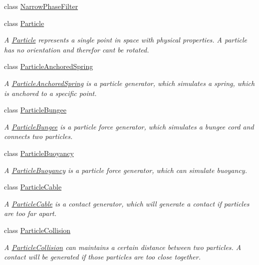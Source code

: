 \begin{DoxyCompactItemize}
class \mbox{\hyperlink{classr3_1_1_narrow_phase_filter}{Narrow\+Phase\+Filter}}
\item 
class \mbox{\hyperlink{classr3_1_1_particle}{Particle}}
\begin{DoxyCompactList}\small\item\em A \mbox{\hyperlink{classr3_1_1_particle}{Particle}} represents a single point in space with physical properties. A particle has no orientation and therefor can\textquotesingle{}t be rotated. \end{DoxyCompactList}\item 
class \mbox{\hyperlink{classr3_1_1_particle_anchored_spring}{Particle\+Anchored\+Spring}}
\begin{DoxyCompactList}\small\item\em A \mbox{\hyperlink{classr3_1_1_particle_anchored_spring}{Particle\+Anchored\+Spring}} is a particle generator, which simulates a spring, which is anchored to a specific point. \end{DoxyCompactList}\item 
class \mbox{\hyperlink{classr3_1_1_particle_bungee}{Particle\+Bungee}}
\begin{DoxyCompactList}\small\item\em A \mbox{\hyperlink{classr3_1_1_particle_bungee}{Particle\+Bungee}} is a particle force generator, which simulates a bungee cord and connects two particles. \end{DoxyCompactList}\item 
class \mbox{\hyperlink{classr3_1_1_particle_buoyancy}{Particle\+Buoyancy}}
\begin{DoxyCompactList}\small\item\em A \mbox{\hyperlink{classr3_1_1_particle_buoyancy}{Particle\+Buoyancy}} is a particle force generator, which can simulate buoyancy. \end{DoxyCompactList}\item 
class \mbox{\hyperlink{classr3_1_1_particle_cable}{Particle\+Cable}}
\begin{DoxyCompactList}\small\item\em A \mbox{\hyperlink{classr3_1_1_particle_cable}{Particle\+Cable}} is a contact generator, which will generate a contact if particles are too far apart. \end{DoxyCompactList}\item 
class \mbox{\hyperlink{classr3_1_1_particle_collision}{Particle\+Collision}}
\begin{DoxyCompactList}\small\item\em A \mbox{\hyperlink{classr3_1_1_particle_collision}{Particle\+Collision}} can maintains a certain distance between two particles. A contact will be generated if those particles are too close together. \end{DoxyCompactList}\item 

\end{DoxyCompactItemize}
